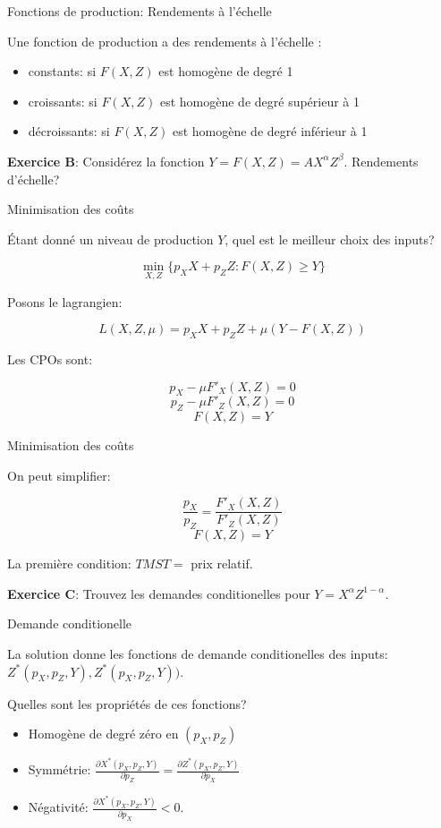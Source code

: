 \documentclass[handout]{beamer}
\begin{document}
\begin{frame}{Fonctions de production: Rendements à l'échelle} 

Une fonction de production a des rendements à l'échelle :

\begin{itemize}
\item constants: si $F(X,Z)$ est homogène de degré 1
\item croissants: si $F(X,Z)$ est homogène de degré supérieur à 1
\item décroissants: si $F(X,Z)$ est homogène de degré inférieur à 1
\end{itemize}

\textbf{Exercice B}: Considérez la fonction $Y=F(X,Z)=A X^\alpha Z^\beta$. Rendements d'échelle?

\end{frame}

\begin{frame}{Minimisation des coûts} 

Étant donné un niveau de production $Y$, quel est le meilleur choix des inputs?

$$ \min_{X,Z} \{ p_X X + p_Z Z : F(X,Z) \ge Y \}$$

Posons le lagrangien: 

$$ L(X,Z,\mu) = p_X X + p_Z Z + \mu(Y - F(X,Z))$$

Les CPOs sont:

$$ p_X - \mu F'_X(X,Z) = 0 $$
$$ p_Z - \mu F'_Z(X,Z) = 0 $$
$$ F(X,Z) = Y $$

\end{frame}

\begin{frame}{Minimisation des coûts} 

On peut simplifier:

$$ \frac{p_X}{p_Z} = \frac{F'_X(X,Z)}{F'_Z(X,Z)} $$
$$ F(X,Z) = Y $$

La première condition: $TMST = $ prix relatif.

\textbf{Exercice C}: Trouvez les demandes conditionelles pour $Y=X^\alpha Z^{1-\alpha}$. 
\end{frame}

\begin{frame}{Demande conditionelle} 

La solution donne les fonctions de demande conditionelles des inputs: $Z^*(p_X,p_Z,Y),Z^*(p_X,p_Z,Y))$. 

Quelles sont les propriétés de ces fonctions?
\begin{itemize}
\item Homogène de degré zéro en $(p_X,p_Z)$
\item Symmétrie: $\frac{\partial X^*(p_X,p_Z,Y)}{\partial p_Z} = \frac{\partial Z^*(p_X,p_Z,Y)}{\partial p_X}$
\item Négativité: $\frac{\partial X^*(p_X,p_Z,Y)}{\partial p_X}<0$. 
\end{itemize}
\end{frame}
\end{document}
